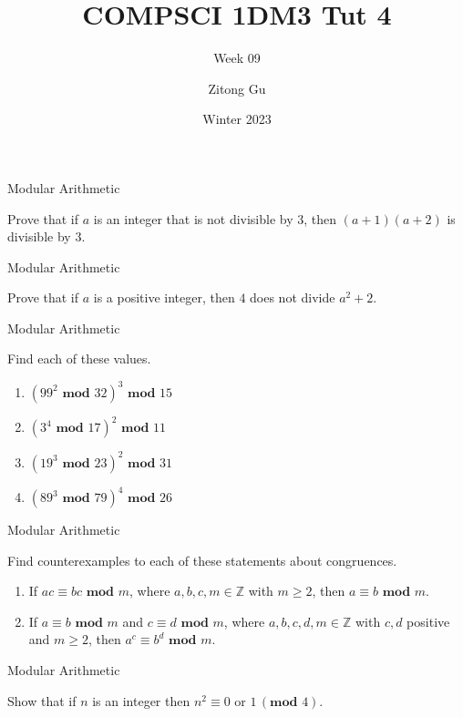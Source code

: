 \documentclass{beamer}
\title{COMPSCI 1DM3 Tut 4}
\subtitle{Week 09}
\author{Zitong Gu}
\institute{McMaster University}
\date{Winter 2023}
\renewcommand{\mod}{\textbf{ mod }}
\begin{document}
\frame{\titlepage}

\begin{frame}[t]{Modular Arithmetic}
    \begin{example}
        Prove that if $a$ is an integer that is not divisible by $3$, then $(a+1)(a+2)$ is divisible by $3$.
    \end{example}
\end{frame}

\begin{frame}[t]{Modular Arithmetic}
    \begin{example}
        Prove that if $a$ is a positive integer, then $4$ does not divide $a^2+2$.
    \end{example}
\end{frame}

\begin{frame}[t]{Modular Arithmetic}
    \begin{example}
        Find each of these values. \begin{enumerate}
            \item $(99^2 \mod 32)^3 \mod 15$
            \item $(3^4 \mod 17)^2 \mod 11$
            \item $(19^3 \mod 23)^2 \mod 31$
            \item $(89^3 \mod 79)^4 \mod 26$
        \end{enumerate}
    \end{example}
\end{frame}

\begin{frame}{Modular Arithmetic}
    \begin{example}
        Find counterexamples to each of these statements about congruences. 
        \begin{enumerate}
            \item If $ac \equiv bc \mod m$, where $a,b,c,m \in \mathbb{Z}$ with $m \geq 2$, then $a \equiv b \mod m$.
            \vspace{16mm}
            \item If $a \equiv b \mod m$ and $c \equiv d \mod m$, where $a,b,c,d,m \in \mathbb{Z}$ with $c,d$ positive and $m \geq 2$, then $a^c \equiv b^d \mod m$.
            \vspace{18mm}
        \end{enumerate}
    \end{example}
\end{frame}

\begin{frame}[t]{Modular Arithmetic}
    \begin{example}
        Show that if $n$ is an integer then $n^2 \equiv 0$ or $1 \, (\textbf{mod } 4)$. 
    \end{example}
\end{frame}
\end{document}
